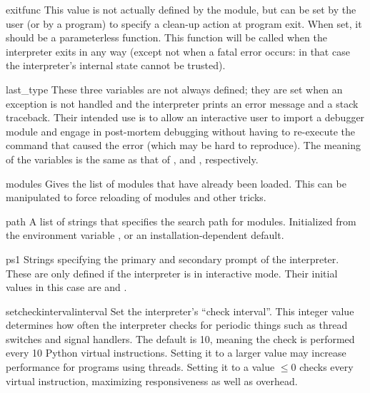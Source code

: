 \begin{datadesc}{exitfunc}
  This value is not actually defined by the module, but can be set by
  the user (or by a program) to specify a clean-up action at program
  exit.  When set, it should be a parameterless function.  This function
  will be called when the interpreter exits in any way (except not when a
  fatal error occurs: in that case the interpreter's internal state
  cannot be trusted).
\end{datadesc}

\begin{datadesc}{last_type}
  These three variables are not always defined; they are set when an
  exception is not handled and the interpreter prints an error message
  and a stack traceback.  Their intended use is to allow an interactive
  user to import a debugger module and engage in post-mortem debugging
  without having to re-execute the command that caused the error (which
  may be hard to reproduce).  The meaning of the variables is the same
  as that of ,  and ,
  respectively.
\end{datadesc}

\begin{datadesc}{modules}
  Gives the list of modules that have already been loaded.
  This can be manipulated to force reloading of modules and other tricks.
\end{datadesc}

\begin{datadesc}{path}
  A list of strings that specifies the search path for modules.
  Initialized from the environment variable , or an
  installation-dependent default.
\end{datadesc}

\begin{datadesc}{ps1}
  Strings specifying the primary and secondary prompt of the
  interpreter.  These are only defined if the interpreter is in
  interactive mode.  Their initial values in this case are
   and .
\end{datadesc}

\begin{funcdesc}{setcheckinterval}{interval}
Set the interpreter's ``check interval''.  This integer value
determines how often the interpreter checks for periodic things such
as thread switches and signal handlers.  The default is 10, meaning
the check is performed every 10 Python virtual instructions.  Setting
it to a larger value may increase performance for programs using
threads.  Setting it to a value $\leq 0$ checks every virtual instruction,
maximizing responsiveness as well as overhead.
\end{funcdesc}

